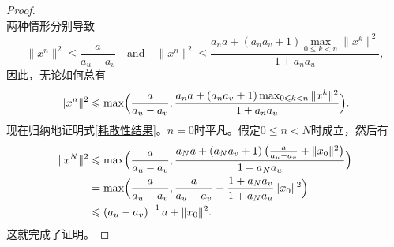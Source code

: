 \begin{proof}
\begin{equation}
    \end{equation}    
    两种情形分别导致
    \begin{equation*}
        \|x^n\|^2 \leqslant \frac{a}{a_u-a_v} \quad \text{and} \quad \|x^n\|^2 \leqslant \frac{a_na+\left(a_na_v+1\right)\max_{0\leqslant k<n}\|x^k\|^2}{1+a_na_u},
    \end{equation*}
    因此，无论如何总有
    \begin{equation*}
        \|x^n\|^2\leqslant \max\Bigl(\frac{a}{a_u-a_v}, \frac{a_na+\left(a_na_v+1\right)\max_{0\leqslant k<n}\|x^k\|^2}{1+a_na_u}\Bigr).
    \end{equation*}
    现在归纳地证明式\eqref{耗散性结果}。$n=0$时平凡。假定$0\leqslant n<N$时成立，然后有
    \begin{align*}
        \|x^N\|^2 &\leqslant \max\Bigl(\frac{a}{a_u-a_v}, \frac{a_Na+\left(a_Na_v+1\right)\bigl(\frac{a}{a_u-a_v}+\|x_0\|^2\bigr)}{1+a_Na_u}\Bigr)
        \\ &= \max\Bigl(\frac{a}{a_u-a_v}, \frac{a}{a_u-a_v}+\frac{1+a_Na_v}{1+a_Na_u}\|x_0\|^2\Bigr)
        \\ &\leqslant \left(a_u-a_v\right)^{-1}a+\|x_0\|^2.
    \end{align*}
    这就完成了证明。
\end{proof}

